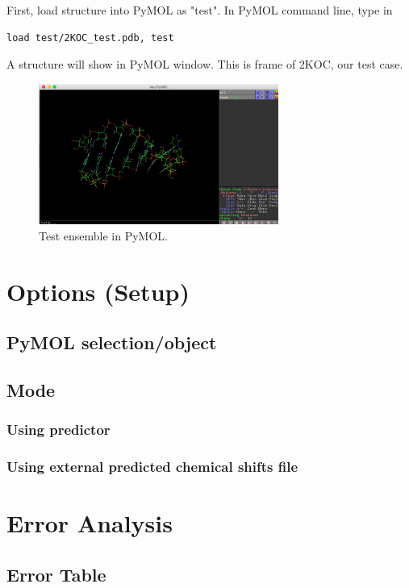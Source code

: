 \documentclass{article}
\begin{document}
First, load structure into PyMOL as "test". In PyMOL command line, type in
\begin{lstlisting}
load test/2KOC_test.pdb, test
\end{lstlisting}

A structure will show in PyMOL window. This is frame of 2KOC, our test case.
\begin{figure}[htbp]
\centering
\includegraphics[width=0.7\textwidth]{test_ensemble}
\caption{Test ensemble in PyMOL.}
\label{fig:test1}
\end{figure}


\newpage
\section{Options (Setup)}

\subsection{PyMOL selection/object}
\subsection{Mode}
\subsubsection{Using predictor}
\subsubsection{Using external predicted chemical shifts file}


\newpage
\section{Error Analysis}
\subsection{Error Table}
\end{document}
